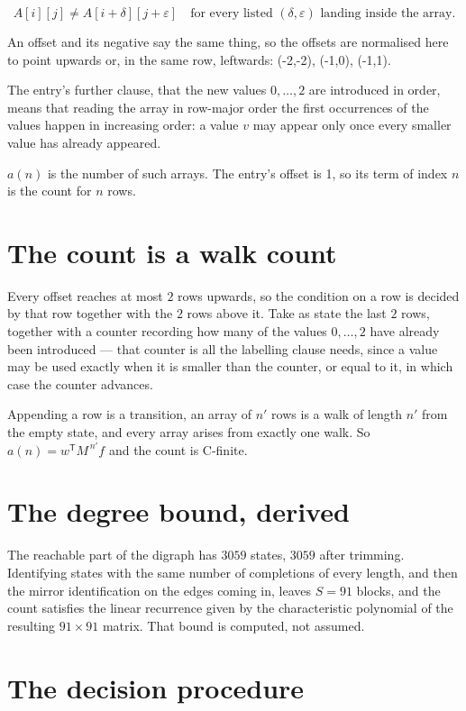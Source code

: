 \documentclass[11pt]{article}
\theoremstyle{definition}
\begin{document}
\[A[i][j] \ne A[i{+}\delta][j{+}\varepsilon]\quad\text{for every listed }(\delta,\varepsilon)\text{ landing inside the array.}\]

An offset and its negative say the same thing, so the offsets are normalised here to point upwards or, in the same row, leftwards: (-2,-2), (-1,0), (-1,1).

The entry's further clause, that the new values $0,\dots,2$ are introduced in order, means that reading the array in row-major order the first occurrences of the values happen in increasing order: a value $v$ may appear only once every smaller value has already appeared.

$a(n)$ is the number of such arrays. The entry's offset is 1, so its term of index $n$ is the count for $n$ rows.

\section{The count is a walk count}

Every offset reaches at most $2$ rows upwards, so the condition on a row is decided by that row together with the $2$ rows above it. Take as state the last $2$ rows, together with a counter recording how many of the values $0,\dots,2$ have already been introduced --- that counter is all the labelling clause needs, since a value may be used exactly when it is smaller than the counter, or equal to it, in which case the counter advances.

Appending a row is a transition, an array of $n'$ rows is a walk of length $n'$ from the empty state, and every array arises from exactly one walk. So $a(n) = w^{\mathsf T}M^{\,n'}f$ and the count is C-finite.

\section{The degree bound, derived}

The reachable part of the digraph has $3059$ states, $3059$ after trimming. Identifying states with the same number of completions of every length, and then the mirror identification on the edges coming in, leaves $S = 91$ blocks, and the count satisfies the linear recurrence given by the characteristic polynomial of the resulting $91\times91$ matrix. That bound is computed, not assumed.

\section{The decision procedure}
\end{document}
